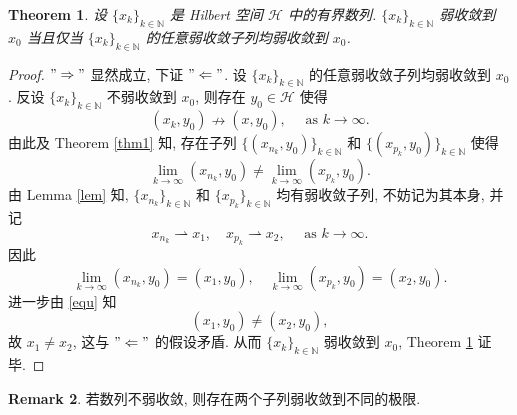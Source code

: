 \documentclass[a4paper,11pt]{article}
\newtheorem{theorem}{Theorem}[section]
\theoremstyle{definition}
\newtheorem{remark}[theorem]{Remark}
\begin{document}
\begin{CJK*}{UTF8}{gbsn}
\begin{theorem} \label{thm2}
    设 $ \{x_k\}_{k \in \mathbb{N}} $ 是 Hilbert 空间 $ \mathcal{H} $ 中的有界数列.
    $ \{x_k\}_{k \in \mathbb{N}} $ 弱收敛到 $ x_0 $ 当且仅当 
    $ \{x_k\}_{k \in \mathbb{N}} $ 的任意弱收敛子列均弱收敛到 $ x_0 $.
\end{theorem}

\begin{proof}
    $ "\Rightarrow" $ 显然成立, 下证 $ "\Leftarrow" $. 
    设 $ \{x_k\}_{k \in \mathbb{N}} $ 的任意弱收敛子列均弱收敛到 $ x_0 $.
    反设 $ \{x_k\}_{k \in \mathbb{N}} $ 不弱收敛到 $ x_0 $, 
    则存在 $ y_0 \in \mathcal{H} $ 使得
    $$
        (x_k, y_0) \nrightarrow (x, y_0), \quad \text{ as } k \to \infty.
    $$
    由此及 Theorem \ref{thm1} 知, 存在子列 $ \{(x_{n_k}, y_0)\}_{k \in \mathbb{N}} $ 
    和 $ \{(x_{p_k}, y_0)\}_{k \in \mathbb{N}} $ 使得
    \begin{equation} \label{equ}
        \lim_{k \to \infty} (x_{n_k}, y_0) \neq \lim_{k \to \infty} (x_{p_k}, y_0).
    \end{equation}
    由 Lemma \ref{lem} 知, $ \{x_{n_k}\}_{k \in \mathbb{N}} $ 和 $ \{x_{p_k}\}_{k \in \mathbb{N}} $
    均有弱收敛子列, 不妨记为其本身, 并记  
    $$
        x_{n_k} \rightharpoonup x_1, \quad 
        x_{p_k} \rightharpoonup x_2, \quad \text{ as } k \to \infty.
    $$
    因此
    $$
        \lim_{k \to \infty} (x_{n_k}, y_0) = (x_1, y_0), \quad
        \lim_{k \to \infty} (x_{p_k}, y_0) = (x_2, y_0).
    $$
    进一步由 \eqref{equ} 知
    $$
        (x_1, y_0) \neq (x_2, y_0),
    $$
    故 $ x_1 \neq x_2 $, 这与 $ "\Leftarrow" $ 的假设矛盾. 
    从而 $ \{x_k\}_{k \in \mathbb{N}} $ 弱收敛到 $ x_0 $, Theorem \ref{thm2} 证毕.
\end{proof}

\begin{remark}
    若数列不弱收敛, 则存在两个子列弱收敛到不同的极限.
\end{remark}

\end{CJK*}
\end{document}
